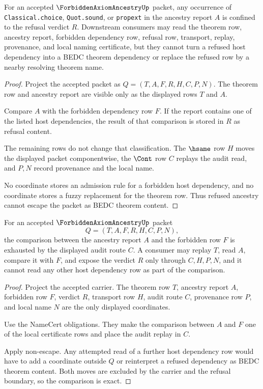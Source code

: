 \begin{theorem}
\label{thm:forbidden-axiom-ancestry-non-escape}
For an accepted $\ForbiddenAxiomAncestryUp$ packet, any occurrence of \texttt{Classical.choice}, \texttt{Quot.sound}, or \texttt{propext} in the ancestry report $A$ is confined to the refusal verdict $R$. Downstream consumers may read the theorem row, ancestry report, forbidden dependency row, refusal row, transport, replay, provenance, and local naming certificate, but they cannot turn a refused host dependency into a BEDC theorem dependency or replace the refused row by a nearby resolving theorem name.
\end{theorem}
\begin{proof}
Project the accepted packet as $Q=(T,A,F,R,H,C,P,N)$. The theorem row and ancestry report are visible only as the displayed rows $T$ and $A$.

Compare $A$ with the forbidden dependency row $F$. If the report contains one of the listed host dependencies, the result of that comparison is stored in $R$ as refusal content.

The remaining rows do not change that classification. The $\hsame$ row $H$ moves the displayed packet componentwise, the $\Cont$ row $C$ replays the audit read, and $P,N$ record provenance and the local name.

No coordinate stores an admission rule for a forbidden host dependency, and no coordinate stores a fuzzy replacement for the theorem row. Thus refused ancestry cannot escape the packet as BEDC theorem content.
\end{proof}

\begin{theorem}
\label{thm:forbidden-axiom-ancestry-comparison-exactness}
For an accepted $\ForbiddenAxiomAncestryUp$ packet
$$
Q=(T,A,F,R,H,C,P,N),
$$
the comparison between the ancestry report $A$ and the forbidden row $F$ is exhausted by the displayed audit route $C$. A consumer may replay $T$, read $A$, compare it with $F$, and expose the verdict $R$ only through $C,H,P,N$, and it cannot read any other host dependency row as part of the comparison.
\end{theorem}
\begin{proof}
Project the accepted carrier. The theorem row $T$, ancestry report $A$, forbidden row $F$, verdict $R$, transport row $H$, audit route $C$, provenance row $P$, and local name $N$ are the only displayed coordinates.

Use the NameCert obligations. They make the comparison between $A$ and $F$ one of the local certificate rows and place the audit replay in $C$.

Apply non-escape. Any attempted read of a further host dependency row would have to add a coordinate outside $Q$ or reinterpret a refused dependency as BEDC theorem content. Both moves are excluded by the carrier and the refusal boundary, so the comparison is exact.
\end{proof}

